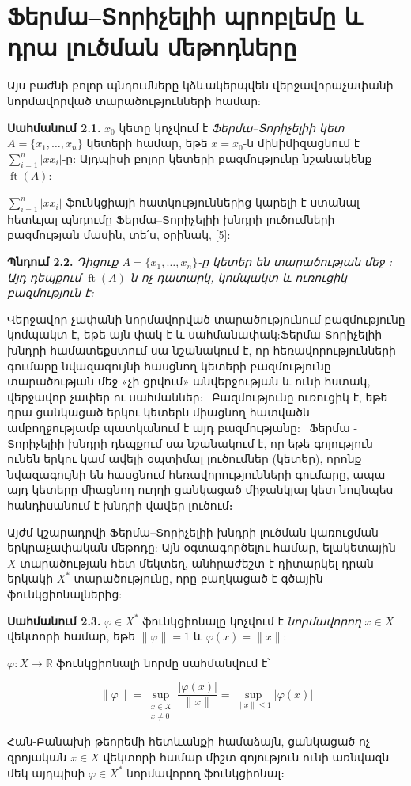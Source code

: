 \documentclass[12pt,a4paper]{article}
\numberwithin{equation}{section}
\numberwithin{figure}{section}
\begin{document}
\section{Ֆերմա--Տորիչելիի պրոբլեմը և դրա լուծման մեթոդները}

Այս բաժնի բոլոր պնդումները կձևակերպվեն վերջավորաչափանի նորմավորված տարածությունների համար:

\textbf{Սահմանում 2.1.} $x_0$ կետը կոչվում է \textit{Ֆերմա--Տորիչելիի կետ} $A = \{x_1, \dots, x_n\}$ կետերի համար, եթե $x = x_0$-ն մինիմիզացնում է $\sum_{i=1}^n |x x_i|$-ը: Այդպիսի բոլոր կետերի բազմությունը նշանակենք $\operatorname{ft}(A)$:

$\sum_{i=1}^n |x x_i|$ ֆունկցիայի հատկություններից կարելի է ստանալ հետևյալ պնդումը Ֆերմա--Տորիչելիի խնդրի լուծումների բազմության մասին, տե՛ս, օրինակ, [5]:

\textbf{Պնդում 2.2.} \textit{Դիցուք $A = \{x_1, \dots, x_n\}$-ը կետեր են տարածության մեջ : Այդ դեպքում $\operatorname{ft}(A)$-ն ոչ դատարկ, կոմպակտ և ուռուցիկ բազմություն է:}

Վերջավոր չափանի նորմավորված տարածությունում բազմությունը կոմպակտ է, եթե այն փակ է և սահմանափակ:Ֆերմա-Տորիչելիի խնդրի համատեքստում սա նշանակում է, որ հեռավորությունների գումարը նվազագույնի հասցնող կետերի բազմությունը տարածության մեջ «չի ցրվում» անվերջության և ունի հստակ, վերջավոր չափեր ու սահմաններ:  Բազմությունը ուռուցիկ է, եթե դրա ցանկացած երկու կետերն միացնող հատվածն ամբողջությամբ պատկանում է այդ բազմությանը:  Ֆերմա - Տորիչելիի խնդրի դեպքում սա նշանակում է, որ եթե գոյություն ունեն երկու կամ ավելի օպտիմալ լուծումներ (կետեր), որոնք նվազագույնի են հասցնում հեռավորությունների գումարը, ապա այդ կետերը միացնող ուղղի ցանկացած միջանկյալ կետ նույնպես հանդիսանում է խնդրի վավեր լուծում։

Այժմ կշարադրվի Ֆերմա--Տորիչելիի խնդրի լուծման կառուցման երկրաչափական մեթոդը: Այն օգտագործելու համար, ելակետային $X$ տարածության հետ մեկտեղ, անհրաժեշտ է դիտարկել դրան երկակի $X^*$ տարածությունը, որը բաղկացած է գծային ֆունկցիոնալներից:

\textbf{Սահմանում 2.3.} $\varphi \in X^*$ ֆունկցիոնալը կոչվում է \textit{նորմավորող} $x \in X$ վեկտորի համար, եթե $\|\varphi\| = 1$ և $\varphi(x) = \|x\|$:

$\varphi: X \to \mathbb{R}$ ֆունկցիոնալի նորմը սահմանվում է՝

$$\|\varphi\| = \sup_{\substack{x \in X \\ x \neq 0}} \frac{|\varphi(x)|}{\|x\|} = \sup_{\|x\| \leq 1} |\varphi(x)|$$

Հան-Բանախի թեորեմի հետևանքի համաձայն, ցանկացած ոչ զրոյական $x \in X$ վեկտորի համար միշտ գոյություն ունի առնվազն մեկ այդպիսի $\varphi \in X^*$ նորմավորող ֆունկցիոնալ։
\end{document}
